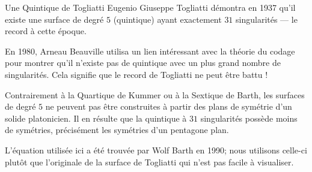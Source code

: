 \begin{surferPage}{Une Quintique de Togliatti}
    Eugenio Giuseppe Togliatti démontra en 1937 qu'il existe une surface de degré $5$ (quintique) ayant exactement $31$ singularités --- le record à cette époque.


    En 1980, Arneau Beauville utilisa un lien intéressant avec la théorie du codage
    pour montrer qu'il n'existe pas de quintique avec un plus grand nombre de
    singularités. 
    Cela signifie que le record de Togliatti ne peut être battu !

    Contrairement à la Quartique de Kummer ou à la Sextique de Barth, les surfaces de degré $5$ 
    ne peuvent pas être construites à partir des plans de symétrie d'un solide platonicien.
    Il en résulte que la quintique à $31$ singularités possède moins de symétries,
    précisément les symétries d'un pentagone plan.


 L'équation utilisée ici a été trouvée par Wolf Barth en 1990; nous utilisons
    celle-ci plutôt que l'originale de la surface de Togliatti qui n'est pas facile à visualiser.
\end{surferPage}
